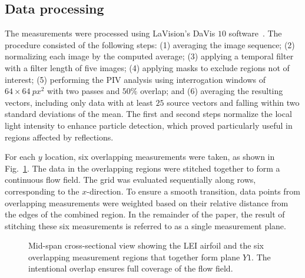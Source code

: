 \documentclass[wes, manuscript]{copernicus}
\begin{document}
\subsection{Data processing}
%
The measurements were processed using LaVision's DaVis $10$ software~\citep{lavision2025}. The procedure consisted of the following steps:
(1) averaging the image sequence;
(2) normalizing each image by the computed average;
(3) applying a temporal filter with a filter length of five images;
(4) applying masks to exclude regions not of interest;
(5) performing the PIV analysis using interrogation windows of $64 \times 64~\unit{px^2}$
with two passes and $50\%$ overlap; and
(6) averaging the resulting vectors, including only data with at least $25$ source vectors and falling within two standard deviations of the mean. The first and second steps normalize the local light intensity to enhance particle detection, which proved particularly useful in regions affected by reflections.

For each $y$ location, six overlapping measurements were taken, as shown in Fig.~\ref{fig:overlapping_measurement_planes}. The data in the overlapping regions were stitched together to form a continuous flow field. The grid was evaluated sequentially along rows, corresponding to the $x$-direction. To ensure a smooth transition, data points from overlapping measurements were weighted based on their relative distance from the edges of the combined region. In the remainder of the paper, the result of stitching these six measurements is referred to as a single measurement plane.
%
\begin{figure}[htp]
    \centering
    \caption{Mid-span cross-sectional view showing the LEI airfoil and the six overlapping measurement regions that together form plane $Y1$. The intentional overlap ensures full coverage of the flow field.}
    \label{fig:overlapping_measurement_planes}
\end{figure}
%
\end{document}
